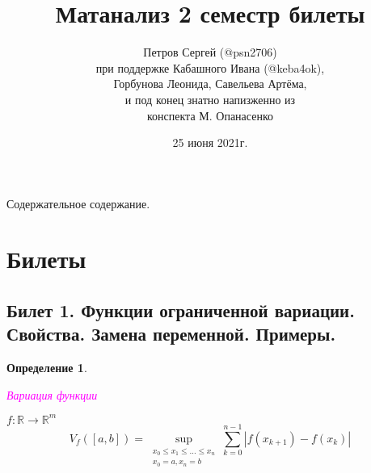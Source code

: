 \documentclass[a4paper]{article}
\title{Матанализ 2 семестр билеты}
\author{Петров Сергей (@psn2706) \\ 
    при поддержке Кабашного Ивана (@keba4ok),\\ 
    Горбунова Леонида, Савельева Артёма, \\ 
    и под конец знатно напизженно из \\ 
    конспекта М. Опанасенко}
\date{25 июня 2021г.}
\theoremstyle{indented}
\theoremstyle{definition}
\newtheorem{defn}{Определение}
\theoremstyle{remark}
\begin{document}

\newcommand{\htarg}[2]{\hypertarget{#1}{\textcolor{magenta}{#2}}}
\newcommand{\hlink}[2]{\hyperlink{#1}{#2}}
\newcommand{\hindex}[2]{\index{#2@\protect\hyperlink{#1}{#2}}}
\newcommand{\Add}[2]
{
    \hypertarget{#1}{\textcolor{magenta}{#2}}
    \index{#2@\protect\hyperlink{#1}{#2}}
}
\newcommand{\df}[2]{\frac{\delta #1}{\delta #2}}


\newcommand{\resetexlcounters}{%
  \setcounter{exl}{0}%
} 

\newcommand{\resetremarkcounters}{%
  \setcounter{remark}{0}%
} 

\newcommand{\reseconscounters}{%
  \setcounter{cons}{0}%
} 

\newcommand{\resetall}{%
    \resetexlcounters
    \resetremarkcounters
    \reseconscounters%
}

\newcommand{\cursed}[1]{\textit{\textcolor{magenta}{#1}}}
\newcommand{\de}[3][2]{\hypertarget{#2}{\cursed{#3}}}

\maketitle 

\newpage

\hypertarget{sod}{Содержательное содержание.}

\tableofcontents

\newpage


\section{Билеты}

\subsection{Билет 1. Функции ограниченной вариации. Свойства. Замена переменной. Примеры.}

\begin{defn}
    \de{1}{Вариация функции}
    $f: \mathbb{R} \to \mathbb{R}^m$
    \[
        V_f([a,b])=\sup\limits_{
            \begin{smallmatrix}
                x_0 \leq x_1 \leq \dots \leq x_n \\
                x_0=a, x_n=b
            \end{smallmatrix}
        }
        \sum\limits_{k=0}^{n-1} |f(x_{k+1})-f(x_k)|
    \]
\end{defn}
\end{document}
